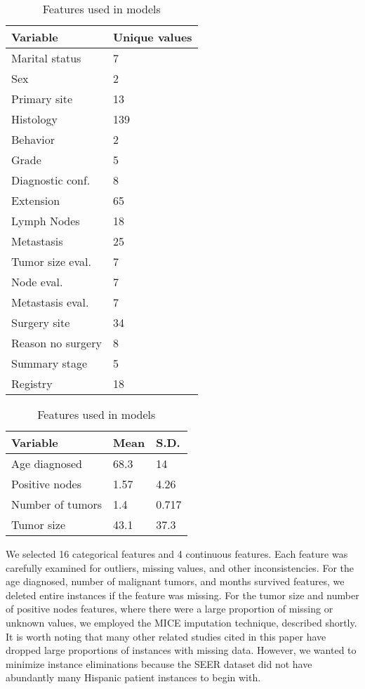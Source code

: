 \documentclass[review]{elsarticle}
\begin{document}
\begin{table}[H]
	\centering
	\tiny
	\begin{tabular}{ll}
		\textbf{Variable} & \textbf{Unique values}  \\ 
		\hline
		Marital status    & 7                       \\
		Sex               & 2                       \\
		Primary site      & 13                      \\
		Histology         & 139                     \\
		Behavior          & 2                       \\
		Grade             & 5                       \\
		Diagnostic conf.  & 8                       \\
		Extension         & 65                      \\
		Lymph Nodes       & 18                      \\
		Metastasis        & 25                      \\
		Tumor size eval.  & 7                       \\
		Node eval.        & 7                       \\
		Metastasis eval.  & 7                       \\
		Surgery site      & 34                      \\
		Reason no surgery & 8                       \\
		Summary stage     & 5                       \\
		Registry          & 18                      \\
	\end{tabular}
	\quad
	\centering
	\begin{tabular}{lll}
		\textbf{Variable} & \textbf{Mean} & \textbf{S.D.}  \\ 
		\hline
		Age diagnosed     & 68.3          & 14             \\
		Positive nodes    & 1.57          & 4.26           \\
		Number of tumors  & 1.4           & 0.717          \\
		Tumor size        & 43.1          & 37.3          
	\end{tabular}
	\caption{Features used in models}
	\label{variable-info}
\end{table}

We selected 16 categorical features and 4 continuous features. Each feature was carefully examined for outliers, missing values, and other inconsistencies. For the age diagnosed, number of malignant tumors, and months survived features, we deleted entire instances if the feature was missing. For the tumor size and number of positive nodes features,  where there were a large proportion of missing or unknown values, we employed the MICE imputation technique, described shortly. It is worth noting that many other related studies cited in this paper have dropped large proportions of instances with missing data. However, we wanted to minimize instance eliminations because the SEER dataset did not have abundantly many Hispanic patient instances to begin with.
\end{document}

